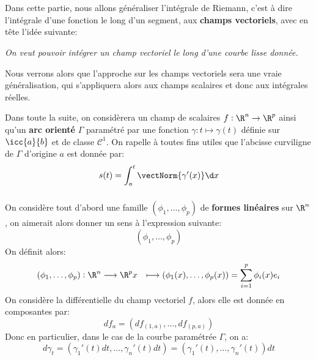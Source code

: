 \chapter*{}

\chapter*{}

Dans cette partie, nous allons généraliser l'intégrale de Riemann, c'est à dire l'intégrale d'une fonction le long d'un segment, aux \textbf{champs vectoriels}, avec en tête l'idée suivante:
\begin{center}
   \textit{On veut pouvoir intégrer un champ vectoriel le long d'une courbe lisse donnée.}
\end{center}
Nous verrons alors que l'approche sur les champs vectoriels sera une vraie généralisation, qui s'appliquera alors aux champs scalaires et donc aux intégrales réelles.\<

Dans toute la suite, on considèrera un champ de scalaires \(f : \R^n \rightarrow \R^p\) ainsi qu'un \textbf{arc orienté} \(\Gamma\) paramétré par une fonction \(\gamma : t \mapsto \gamma(t)\) définie sur \(\icc{a}{b}\) et de classe \(\mathcal{C}^1\). On rapelle à toutes fins utiles que l'abcisse curviligne de \(\Gamma\) d'origine \(a\) est donnée par:
\[
   s(t) = \int_{a}^{t} \vectNorm{\gamma'(x)} \d x   
\] 

\subsection*{}
On considère tout d'abord une famille \((\phi_1, \ldots, \phi_p)\) de \textbf{formes linéaires} sur \(\R^n\), on aimerait alors donner un sens à l'expression suivante:
\[
   (\phi_1, \ldots, \phi_p)   
\]
On définit alors:
\[
   \begin{aligned}
      (\phi_1, \ldots, \phi_p) : \R^n &\longrightarrow \R^p
      x &\longmapsto (\phi_1(x), \ldots, \phi_p(x)) = \sum_{i=1}^{p} \phi_i(x)e_i
   \end{aligned}
\]
On considère la différentielle du champ vectoriel \(f\), alors elle est donnée en composantes par:
\[
   df_a = (df_{(1, a)}, \ldots, df_{(p, a)})   
\]
Donc en particulier, dans le cas de la courbe paramétrée \(\Gamma\), on a:
\[
   d\gamma_t = (\gamma_1'(t) dt, \ldots, \gamma_n'(t) dt) = (\gamma_1'(t), \ldots, \gamma_n'(t))dt  
\]